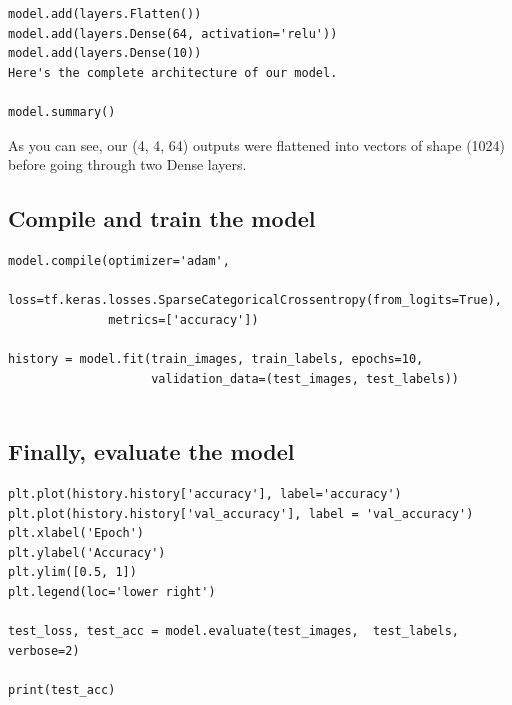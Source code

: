 \documentclass[%
oneside,                 %
final,                   %
10pt]{article}
\begin{document}
\begin{verbatim}
model.add(layers.Flatten())
model.add(layers.Dense(64, activation='relu'))
model.add(layers.Dense(10))
Here's the complete architecture of our model.

model.summary()

\end{verbatim}

As you can see, our (4, 4, 64) outputs were flattened into vectors of shape (1024) before going through two Dense layers.

\subsection{Compile and train the model}









\begin{verbatim}
model.compile(optimizer='adam',
              loss=tf.keras.losses.SparseCategoricalCrossentropy(from_logits=True),
              metrics=['accuracy'])

history = model.fit(train_images, train_labels, epochs=10, 
                    validation_data=(test_images, test_labels))


\end{verbatim}


\subsection{Finally, evaluate the model}













\begin{verbatim}
plt.plot(history.history['accuracy'], label='accuracy')
plt.plot(history.history['val_accuracy'], label = 'val_accuracy')
plt.xlabel('Epoch')
plt.ylabel('Accuracy')
plt.ylim([0.5, 1])
plt.legend(loc='lower right')

test_loss, test_acc = model.evaluate(test_images,  test_labels, verbose=2)

print(test_acc)


\end{verbatim}



\end{document}
